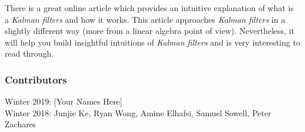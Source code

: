 \documentclass[twoside]{article}
\begin{document}
There is a great online article \cite{HowKF} which provides an intuitive explanation of what is a \textit{Kalman filters} and how it works. This article approaches \textit{Kalman filters} in a slightly different way (more from a linear algebra point of view). Nevertheless, it will help you build insightful intuitions of \textit{Kalman filters} and is very interesting to read through.





\subsubsection*{Contributors}
Winter 2019: [Your Names Here]
\\
Winter 2018: Junjie Ke, Ryan Wong, Amine Elhafsi, Samuel Sowell, Peter Zachares
\end{document}

